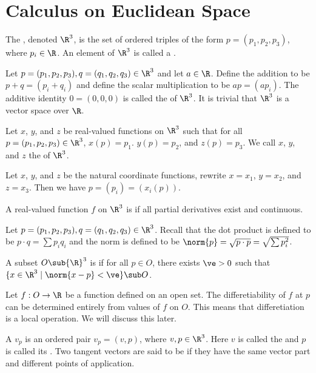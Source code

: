 \documentclass[10pt]{article}
\begin{document}
\hstart
\par
\section{Calculus on Euclidean Space}
\begin{definition}
    The , denoted ${\R}^{3}$, is the set of ordered triples of the form $p=({p}_{1},{p}_{2},{p}_{3})$, where ${p}_{i}\in\R$. An element of ${\R}^{3}$ is called a .
\end{definition}
\par
Let $p=({p}_{1},{p}_{2},{p}_{3}),q=({q}_{1},{q}_{2},{q}_{3})\in{\R}^{3}$ and let $a\in\R$. Define the addition to be $p+q=({p}_{i}+{q}_{i})$ and define the scalar multiplication to be $ap=(a{p}_{i})$. The additive identity $0=(0,0,0)$ is called the  of ${\R}^{3}$. It is trivial that ${\R}^{3}$ is a vector space over $\R$.
\begin{definition}
    Let $x$, $y$, and $z$ be real-valued functions on ${\R}^{3}$ such that for all $p=({p}_{1},{p}_{2},{p}_{3})\in{\R}^{3}$, $x(p)={p}_{1}$. $y(p)={p}_{2}$, and $z(p)={p}_{3}$. We call $x$, $y$, and $z$ the  of ${\R}^{3}$.
\end{definition}
\par
Let $x$, $y$, and $z$ be the natural coordinate functions, rewrite $x={x}_{1}$, $y={x}_{2}$, and $z={x}_{3}$. Then we have $p=({p}_{i})=({x}_{i}(p))$.
\begin{definition}
    A real-valued function $f$ on ${\R}^{3}$ is  if all partial derivatives exist and continuous.
\end{definition}
\par
Let $p=({p}_{1},{p}_{2},{p}_{3}),q=({q}_{1},{q}_{2},{q}_{3})\in{\R}^{3}$. Recall that the dot product is defined to be $p\cdot q=\sum{p}_{i}{q}_{i}$ and the norm is defined to be $\norm{p}=\sqrt{p\cdot p}=\sqrt{\sum{p}_{i}^{2}}$. 
\begin{definition}
    A subset $O\sub{\R}^{3}$ is  if for all $p\in O$, there exists $\ve>0$ such that $\{x\in{\R}^{3}\mid\norm{x-p}<\ve\}\sub O$. 
\end{definition}
\par
Let $f:O\to\R$ be a function defined on an open set. The differetiability of $f$ at $p$ can be determined entirely from values of $f$ on $O$. This means that differetiation is a local operation. We will discuss this later.
\begin{definition}
    A  ${v}_{p}$ is an ordered pair ${v}_{p}=(v,p)$, where $v,p\in{\R}^{3}$. Here $v$ is called the  and $p$ is called its . Two tangent vectors are said to be  if they have the same vector part and different points of application.
\end{definition}
\end{document}
